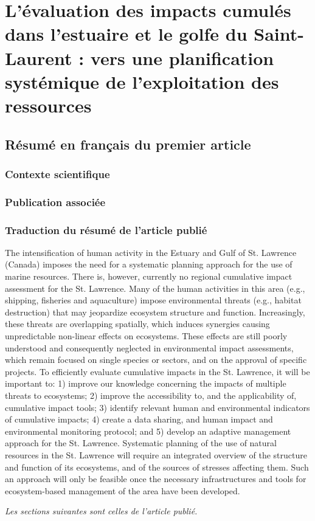 \chapter{L’évaluation des impacts cumulés dans l’estuaire et le golfe du Saint-Laurent : vers une planification systémique de l’exploitation des ressources}
\label{chap1}

\section{Résumé en français du premier article}

\subsection{Contexte scientifique}

\subsection{Publication associée}

\subsection{Traduction du résumé de l'article publié}

The intensification of human activity in the Estuary and Gulf of St. Lawrence (Canada) imposes the need for a systematic planning approach for the use of marine resources. There is, however, currently no regional cumulative impact assessment for the St. Lawrence. Many of the human activities in this area (e.g., shipping, fisheries and aquaculture) impose environmental threats (e.g., habitat destruction) that may jeopardize ecosystem structure and function. Increasingly, these threats are overlapping spatially, which induces synergies causing unpredictable non-linear effects on ecosystems. These effects are still poorly understood and consequently neglected in environmental impact assessments, which remain focused on single species or sectors, and on the approval of specific projects. To efficiently evaluate cumulative impacts in the St. Lawrence, it will be important to: 1) improve our knowledge concerning the impacts of multiple threats to ecosystems; 2) improve the accessibility to, and the applicability of, cumulative impact tools; 3) identify relevant human and environmental indicators of cumulative impacts; 4) create a data sharing, and human impact and environmental monitoring protocol; and 5) develop an adaptive management approach for the St. Lawrence. Systematic planning of the use of natural resources in the St. Lawrence will require an integrated overview of the structure and function of its ecosystems, and of the sources of stresses affecting them. Such an approach will only be feasible once the necessary infrastructures and tools for ecosystem-based management of the area have been developed.

\textit{Les sections suivantes sont celles de l’article publié.}
